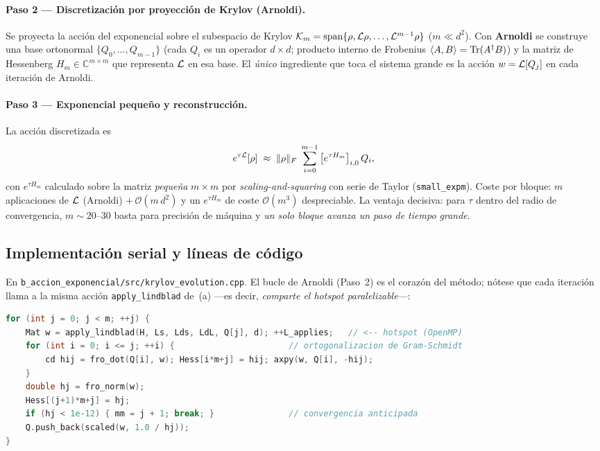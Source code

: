 \paragraph{Paso 2 — Discretización por proyección de Krylov (Arnoldi).} Se proyecta
la acción del exponencial sobre el subespacio de Krylov
$\mathcal{K}_m=\text{span}\{\rho,\mathcal{L}\rho,\dots,\mathcal{L}^{m-1}\rho\}$ ($m\ll d^2$). Con
\textbf{Arnoldi} se construye una base ortonormal $\{Q_0,\dots,Q_{m-1}\}$ (cada
$Q_i$ es un operador $d\times d$; producto interno de Frobenius
$\langle A,B\rangle=\operatorname{Tr}(A^\dagger B)$) y la matriz de Hessenberg
$H_m\in\mathbb{C}^{m\times m}$ que representa $\mathcal{L}$ en esa base. El \emph{único}
ingrediente que toca el sistema grande es la acción $w=\mathcal{L}[Q_j]$ en cada
iteración de Arnoldi.

\paragraph{Paso 3 — Exponencial pequeño y reconstrucción.} La acción discretizada es
\[
e^{\tau\mathcal{L}}[\rho]\;\approx\;\|\rho\|_F\;\sum_{i=0}^{m-1}\big[e^{\tau H_m}\big]_{i,0}\,Q_i,
\]
con $e^{\tau H_m}$ calculado sobre la matriz \emph{pequeña} $m\times m$ por
\emph{scaling-and-squaring} con serie de Taylor (\texttt{small\_expm}). Coste por
bloque: $m$ aplicaciones de $\mathcal{L}$ (Arnoldi) $+\,\mathcal{O}(m\,d^2)$ y un
$e^{\tau H_m}$ de coste $\mathcal{O}(m^3)$ despreciable. La ventaja decisiva: para
$\tau$ dentro del radio de convergencia, $m\sim20$--$30$ basta para precisión de
máquina y \emph{un solo bloque avanza un paso de tiempo grande}.

\subsection{Implementación serial y líneas de código}
En \texttt{b\_accion\_exponencial/src/krylov\_evolution.cpp}. El bucle de Arnoldi
(Paso~2) es el corazón del método; nótese que cada iteración llama a la misma
acción \texttt{apply\_lindblad} de~(a) —es decir, \emph{comparte el hotspot
paralelizable}—:

\begin{lstlisting}[language=C++,caption={Bucle de Arnoldi de \texttt{krylov\_step} (\texttt{krylov\_evolution.cpp}): la línea \texttt{apply\_lindblad(...)} es la acción matrix-free de $\mathcal L$, donde se cuenta el trabajo (\texttt{L\_applies}) y donde reside la paralelización OpenMP (vía \texttt{matmul}, Listado~\ref{lst:t2b_omp}).},label={lst:t2b_arnoldi}]
for (int j = 0; j < m; ++j) {
    Mat w = apply_lindblad(H, Ls, Lds, LdL, Q[j], d); ++L_applies;   // <-- hotspot (OpenMP)
    for (int i = 0; i <= j; ++i) {                       // ortogonalizacion de Gram-Schmidt
        cd hij = fro_dot(Q[i], w); Hess[i*m+j] = hij; axpy(w, Q[i], -hij);
    }
    double hj = fro_norm(w);
    Hess[(j+1)*m+j] = hj;
    if (hj < 1e-12) { mm = j + 1; break; }               // convergencia anticipada
    Q.push_back(scaled(w, 1.0 / hj));
}
\end{lstlisting}

